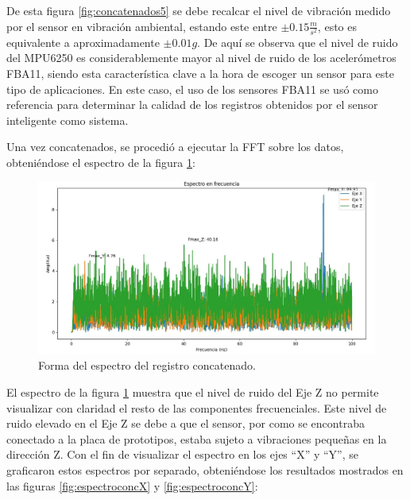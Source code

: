 De esta figura \ref{fig:concatenados5} se debe recalcar el nivel de vibración medido por el sensor en vibración ambiental, estando este entre $\pm 0.15 \frac{m}{s^2}$, esto es equivalente a aproximadamente $\pm 0.01 g$. De aquí se observa que el nivel de ruido del MPU6250 es considerablemente mayor al nivel de ruido de los acelerómetros FBA11, siendo esta característica clave a la hora de escoger un sensor para este tipo de aplicaciones. En este caso, el uso de los sensores FBA11 se usó como referencia para determinar la calidad de los registros obtenidos por el sensor inteligente como sistema.

Una vez concatenados, se procedió a ejecutar la FFT sobre los datos, obteniéndose el espectro de la figura \ref{fig:espectroconc}:

\begin{figure}[H]
    \centering
    \includegraphics[width = \textwidth]{imagenes/cap3_resultados/Ensayos/VibAmb5EspectroCONC.jpg}
    \caption{Forma del espectro del registro concatenado.}
    \label{fig:espectroconc}
\end{figure}

El espectro de la figura \ref{fig:espectroconc} muestra que el nivel de ruido del Eje Z no permite visualizar con claridad el resto de las componentes frecuenciales. Este nivel de ruido elevado en el Eje Z se debe a que el sensor, por como se encontraba conectado a la placa de prototipos, estaba sujeto a vibraciones pequeñas en la dirección Z. Con el fin de visualizar el espectro en los ejes ``X'' y ``Y'', se graficaron estos espectros por separado, obteniéndose los resultados mostrados en las figuras \ref{fig:espectroconcX} y \ref{fig:espectroconcY}:



